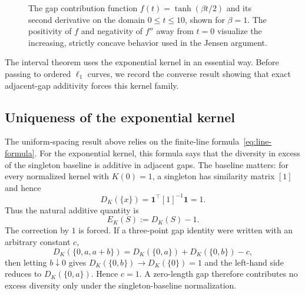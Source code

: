 \documentclass[12pt,a4paper]{article}
\newcommand{\plotbeta}{1}
\begin{document}
\begin{figure}[t]
\centering
{}
\caption{The gap contribution function $f(t)=\tanh(\beta t/2)$ and its second derivative on the domain $0\leq t\leq 10$, shown for $\beta=\plotbeta$.  The positivity of $f$ and negativity of $f''$ away from $t=0$ visualize the increasing, strictly concave behavior used in the Jensen argument.}
\label{fig:f-and-second-derivative}
\end{figure}

The interval theorem uses the exponential kernel in an essential way.  Before passing to ordered $\ell_1$ curves, we record the converse result showing that exact adjacent-gap additivity forces this kernel family.

\subsection{Uniqueness of the exponential kernel}
\label{sec:exponential-kernel-uniqueness}

The uniform-spacing result above relies on the finite-line formula~\eqref{eq:line-formula}.  For the exponential kernel, this formula says that the diversity in excess of the singleton baseline is additive in adjacent gaps.  The baseline matters: for every normalized kernel with $K(0)=1$, a singleton has similarity matrix $[1]$ and hence
\[
  D_K(\{x\})=\mathbf{1}^\top [1]^{-1}\mathbf{1}=1.
\]
Thus the natural additive quantity is
\[
  E_K(S):=D_K(S)-1.
\]
The correction by $1$ is forced.  If a three-point gap identity were written with an arbitrary constant $c$,
\[
  D_K(\{0,a,a+b\})
  =D_K(\{0,a\})+D_K(\{0,b\})-c,
\]
then letting $b\downarrow0$ gives $D_K(\{0,b\})\to D_K(\{0\})=1$ and the left-hand side reduces to $D_K(\{0,a\})$.  Hence $c=1$.  A zero-length gap therefore contributes no excess diversity only under the singleton-baseline normalization.
\end{document}
